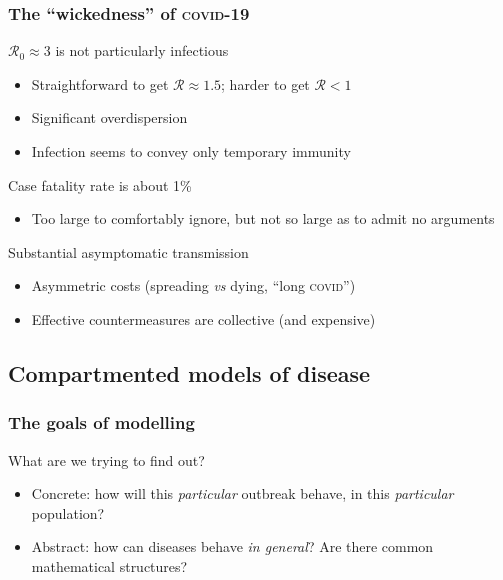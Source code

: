 \documentclass{beamer}
\begin{document}
\begin{frame}
  \frametitle{The ``wickedness'' of \textsc{covid-19}}

  \begin{block}{$\mathcal{R}_0 \approx 3$ is not particularly infectious}
    \begin{itemize}
    \item Straightforward to get $\mathcal{R} \approx 1.5$; harder to get $\mathcal{R} < 1$
    \item Significant overdispersion
    \item Infection seems to convey only temporary immunity
    \end{itemize}
  \end{block}

  \begin{block}{Case fatality rate is about 1\%}
    \begin{itemize}
    \item Too large to comfortably ignore, but not so large as to
      admit no arguments
    \end{itemize}
  \end{block}

  \begin{block}{Substantial asymptomatic transmission} 
    \begin{itemize}
    \item Asymmetric costs (spreading \textit{vs} dying, ``long \textsc{covid}'')
    \item Effective countermeasures are collective (and expensive)
    \end{itemize}
  \end{block}
\end{frame}


\subsection{Compartmented models of disease}

\begin{frame}
  \frametitle{The goals of modelling}

  \begin{block}{What are we trying to find out?}
    \begin{itemize}
    \item Concrete: how will this \textit{particular} outbreak behave, in this
      \textit{particular} population?
    \item Abstract: how can diseases behave \textit{in general}? Are
      there common mathematical structures?
    \end{itemize}
  \end{block}
\end{frame}
\end{document}
